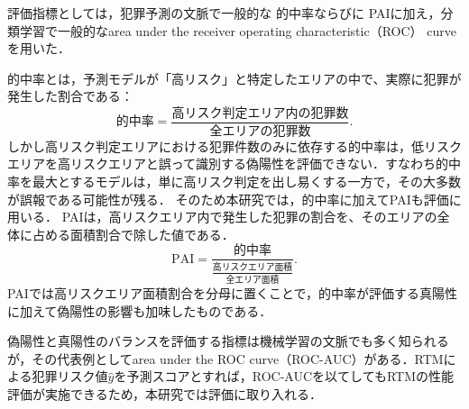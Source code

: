 評価指標としては，犯罪予測の文脈で一般的な
的中率\cite{joshi2020considerationsdevelopingpredictivemodels}ならびに
PAI\cite{chainey2008utility}に加え，分類学習で一般的なarea under the receiver operating characteristic（ROC） curve\cite{islp}を用いた．

的中率とは，予測モデルが「高リスク」と特定したエリアの中で、実際に犯罪が発生した割合である：
\begin{equation}\label{hitrate}
  的中率=\frac{高リスク判定エリア内の犯罪数}{全エリアの犯罪数}.
\end{equation}
しかし高リスク判定エリアにおける犯罪件数のみに依存する的中率は，低リスクエリアを高リスクエリアと誤って識別する偽陽性を評価できない．すなわち的中率を最大とするモデルは，単に高リスク判定を出し易くする一方で，その大多数が誤報である可能性が残る．
%
そのため本研究では，的中率に加えてPAI\cite{chainey2008utility}も評価に用いる．
PAIは，高リスクエリア内で発生した犯罪の割合を、そのエリアの全体に占める面積割合で除した値である．
\begin{equation}\label{pai}
  \mathrm{PAI}=\frac{的中率}{\frac{高リスクエリア面積}{全エリア面積}}.
\end{equation}
PAIでは高リスクエリア面積割合を分母に置くことで，的中率が評価する真陽性に加えて偽陽性の影響も加味したものである．

偽陽性と真陽性のバランスを評価する指標は機械学習の文脈でも多く知られるが，その代表例としてarea under the ROC curve（ROC-AUC）がある\cite{islp}．RTMによる犯罪リスク値$\hat y$を予測スコアとすれば，ROC-AUCを以てしてもRTMの性能評価が実施できるため，本研究では評価に取り入れる．

